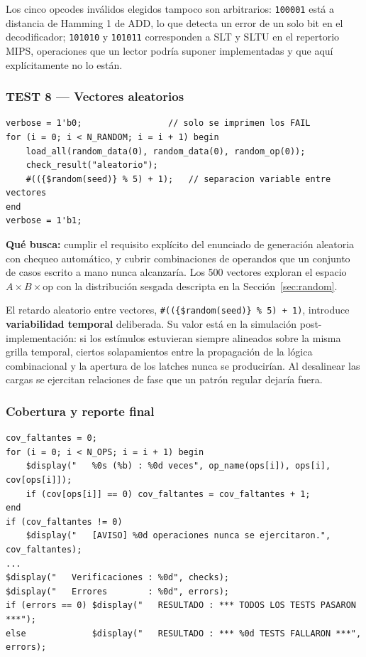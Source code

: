 \documentclass[12pt,a4paper]{article}
\begin{document}
Los cinco opcodes inválidos elegidos tampoco son arbitrarios:
\texttt{100001} está a distancia de Hamming 1 de ADD, lo que detecta un error de
un solo bit en el decodificador; \texttt{101010} y \texttt{101011} corresponden
a SLT y SLTU en el repertorio MIPS, operaciones que un lector podría suponer
implementadas y que aquí explícitamente no lo están.

\subsubsection{TEST 8 --- Vectores aleatorios}

\begin{lstlisting}[caption={Bucle de prueba aleatoria.}]
verbose = 1'b0;                 // solo se imprimen los FAIL
for (i = 0; i < N_RANDOM; i = i + 1) begin
    load_all(random_data(0), random_data(0), random_op(0));
    check_result("aleatorio");
    #(({$random(seed)} % 5) + 1);   // separacion variable entre vectores
end
verbose = 1'b1;
\end{lstlisting}

\textbf{Qué busca:} cumplir el requisito explícito del enunciado de generación
aleatoria con chequeo automático, y cubrir combinaciones de operandos que un
conjunto de casos escrito a mano nunca alcanzaría. Los 500 vectores exploran el
espacio $A \times B \times \mathrm{op}$ con la distribución sesgada descripta en
la Sección~\ref{sec:random}.

El retardo aleatorio entre vectores, \texttt{\#((\{\$random(seed)\} \% 5) + 1)},
introduce \textbf{variabilidad temporal} deliberada. Su valor está en la
simulación post-implementación: si los estímulos estuvieran siempre alineados
sobre la misma grilla temporal, ciertos solapamientos entre la propagación de la
lógica combinacional y la apertura de los latches nunca se producirían. Al
desalinear las cargas se ejercitan relaciones de fase que un patrón regular
dejaría fuera.

\subsubsection{Cobertura y reporte final}

\begin{lstlisting}[caption={Reporte de cobertura y resumen.}]
cov_faltantes = 0;
for (i = 0; i < N_OPS; i = i + 1) begin
    $display("   %0s (%b) : %0d veces", op_name(ops[i]), ops[i], cov[ops[i]]);
    if (cov[ops[i]] == 0) cov_faltantes = cov_faltantes + 1;
end
if (cov_faltantes != 0)
    $display("   [AVISO] %0d operaciones nunca se ejercitaron.", cov_faltantes);
...
$display("   Verificaciones : %0d", checks);
$display("   Errores        : %0d", errors);
if (errors == 0) $display("   RESULTADO : *** TODOS LOS TESTS PASARON ***");
else             $display("   RESULTADO : *** %0d TESTS FALLARON ***", errors);
\end{lstlisting}
\end{document}
